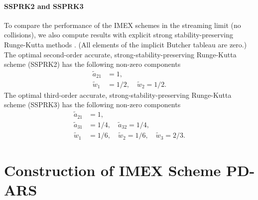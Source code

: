 \paragraph{SSPRK2 and SSPRK3}

To compare the performance of the IMEX schemes in the streaming limit (no collisions), we also compute results with explicit strong stability-preserving Runge-Kutta methods \cite{gottlieb_etal_2001}.  
(All elements of the implicit Butcher tableau are zero.)  
The optimal second-order accurate, strong-stability-preserving Runge-Kutta scheme (SSPRK2) has the following non-zero components
\begin{align}
  \tilde{a}_{21} &= 1, \nonumber \\ 
  \tilde{w}_{1}  &= 1/2, \quad \tilde{w}_{2} = 1/2. \nonumber 
\end{align}
The optimal third-order accurate, strong-stability-preserving Runge-Kutta scheme (SSPRK3) has the following non-zero components
\begin{align}
  \tilde{a}_{21} &= 1, \nonumber \\
  \tilde{a}_{31} &= 1/4, \quad \tilde{a}_{32} = 1/4, \nonumber \\
  \tilde{w}_{1} &= 1/6, \quad \tilde{w}_{2} = 1/6, \quad \tilde{w}_{3} =2/3. \nonumber
\end{align}

\newpage 
\section{Construction of IMEX Scheme PD-ARS}
\label{app:PD-ARS}

